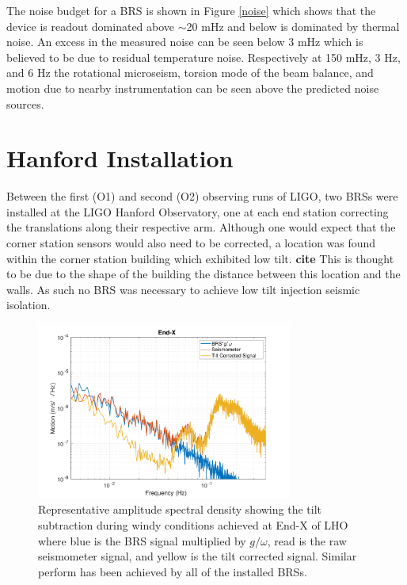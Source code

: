 \documentclass [12pt, proquest]{uwthesis}[2019]
\begin{document}
 The noise budget for a BRS is shown in Figure \ref{noise} which shows that the device is readout dominated above $\sim$20 mHz and below is dominated by thermal noise. An excess in the measured noise can be seen below 3 mHz which is believed to be due to residual temperature noise. Respectively at 150 mHz, 3 Hz, and 6 Hz the rotational microseism, torsion mode of the beam balance, and motion due to nearby instrumentation can be seen above the predicted noise sources.

\section{Hanford Installation} \label{BRS_Hanford}

\quad Between the first (O1) and second (O2) observing runs of LIGO, two BRSs were installed at the LIGO Hanford Observatory, one at each end station correcting the translations along their respective arm. Although one would expect that the corner station sensors would also need to be corrected, a location was found within the corner station building which exhibited low tilt. \textbf{cite} This is thought to be due to the shape of the building the distance between this location and the walls. As such no BRS was necessary to achieve low tilt injection seismic isolation.

\begin{figure}%
\begin{center}
\includegraphics[width=0.75\textwidth]{HSubtractionETMX.pdf}
\caption{Representative amplitude spectral density showing the tilt subtraction during windy conditions achieved at End-X of LHO where blue is the BRS signal multiplied by $g/\omega$, read is the raw seismometer signal, and yellow is the tilt corrected signal. Similar perform has been achieved by all of the installed BRSs.}
\label{sub}
\end{center}
\end{figure}
\end{document}
